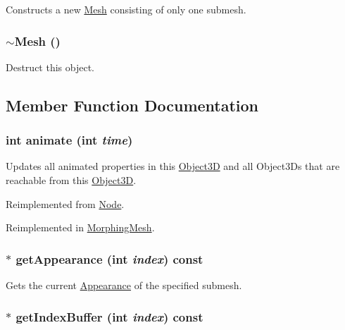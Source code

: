 Constructs a new \hyperlink{classm3g_1_1Mesh}{Mesh} consisting of only one submesh. \hypertarget{classm3g_1_1Mesh_6e26384cfb03023e7dc2e5419baf813f}{
\subsubsection[{$\sim$Mesh}]{\setlength{\rightskip}{0pt plus 5cm}$\sim${\bf Mesh} ()}}
\label{classm3g_1_1Mesh_6e26384cfb03023e7dc2e5419baf813f}


Destruct this object. 

\subsection{Member Function Documentation}
\hypertarget{classm3g_1_1Mesh_82cfeb67ca66b93e2ca7bda9a4f0e2aa}{
\subsubsection[{animate}]{\setlength{\rightskip}{0pt plus 5cm}int animate (int {\em time})}}
\label{classm3g_1_1Mesh_82cfeb67ca66b93e2ca7bda9a4f0e2aa}


Updates all animated properties in this \hyperlink{classm3g_1_1Object3D}{Object3D} and all Object3Ds that are reachable from this \hyperlink{classm3g_1_1Object3D}{Object3D}. 

Reimplemented from \hyperlink{classm3g_1_1Node_8aad1ceab4c2a03609c8a42324ce484d}{Node}.

Reimplemented in \hyperlink{classm3g_1_1MorphingMesh_8aad1ceab4c2a03609c8a42324ce484d}{MorphingMesh}.\hypertarget{classm3g_1_1Mesh_4950a19e02c022dcf41a086117eb8219}{
\subsubsection[{getAppearance}]{ $\ast$ getAppearance (int {\em index}) const}}
\label{classm3g_1_1Mesh_4950a19e02c022dcf41a086117eb8219}


Gets the current \hyperlink{classm3g_1_1Appearance}{Appearance} of the specified submesh. \hypertarget{classm3g_1_1Mesh_ca34a663f46ce20e2b894c046714ea1d}{
\subsubsection[{getIndexBuffer}]{ $\ast$ getIndexBuffer (int {\em index}) const}}
\label{classm3g_1_1Mesh_ca34a663f46ce20e2b894c046714ea1d}


